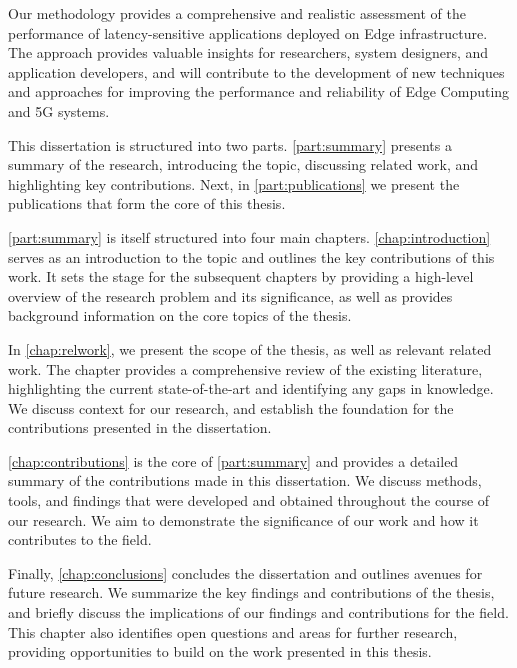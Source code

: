 Our methodology provides a comprehensive and realistic assessment of the performance of latency-sensitive applications deployed on Edge infrastructure.
The approach provides valuable insights for researchers, system designers, and application developers, and will contribute to the development of new techniques and approaches for improving the performance and reliability of Edge Computing and 5G systems.


\medskip

This dissertation is structured into two parts.
\cref{part:summary} presents a summary of the research, introducing the topic, discussing related work, and highlighting key contributions.
Next, in \cref{part:publications} we present the publications that form the core of this thesis.

\cref{part:summary} is itself structured into four main chapters.
\cref{chap:introduction} serves as an introduction to the topic and outlines the key contributions of this work.
It sets the stage for the subsequent chapters by providing a high-level overview of the research problem and its significance, as well as provides background information on the core topics of the thesis.

In \cref{chap:relwork}, we present the scope of the thesis, as well as relevant related work.
The chapter provides a comprehensive review of the existing literature, highlighting the current state-of-the-art and identifying any gaps in knowledge.
We discuss context for our research, and establish the foundation for the contributions presented in the dissertation.

\cref{chap:contributions} is the core of \cref{part:summary} and provides a detailed summary of the contributions made in this dissertation.
We discuss methods, tools, and findings that were developed and obtained throughout the course of our research.
We aim to demonstrate the significance of our work and how it contributes to the field.

Finally, \cref{chap:conclusions} concludes the dissertation and outlines avenues for future research.
We summarize the key findings and contributions of the thesis, and briefly discuss the implications of our findings and contributions for the field.
This chapter also identifies open questions and areas for further research, providing opportunities to build on the work presented in this thesis.